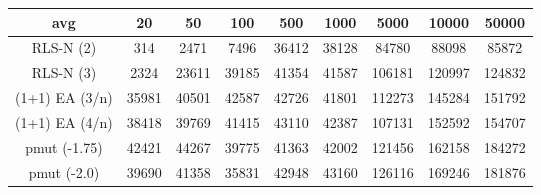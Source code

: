\begin{tabular}[h]{ccccccccc}
avg&20&50&100&500&1000&5000&10000&50000\\\hline
RLS-N (2)&314&2471&7496&36412&38128&84780&88098&85872\\
RLS-N (3)&2324&23611&39185&41354&41587&106181&120997&124832\\
(1+1) EA (3/n)&35981&40501&42587&42726&41801&112273&145284&151792\\
(1+1) EA (4/n)&38418&39769&41415&43110&42387&107131&152592&154707\\
pmut (-1.75)&42421&44267&39775&41363&42002&121456&162158&184272\\
pmut (-2.0)&39690&41358&35831&42948&43160&126116&169246&181876\\
\end{tabular}
